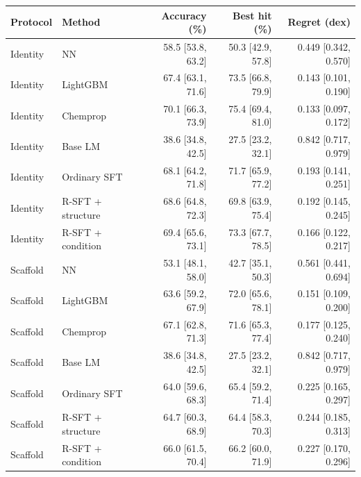 \begingroup\footnotesize
\setlength{\tabcolsep}{3pt}
\begin{tabular}{llrrr}
\toprule
Protocol & Method & Accuracy (\%) & Best hit (\%) & Regret (dex) \\
\midrule
Identity & NN & 58.5 [53.8, 63.2] & 50.3 [42.9, 57.8] & 0.449 [0.342, 0.570] \\
Identity & LightGBM & 67.4 [63.1, 71.6] & 73.5 [66.8, 79.9] & 0.143 [0.101, 0.190] \\
Identity & Chemprop & 70.1 [66.3, 73.9] & 75.4 [69.4, 81.0] & 0.133 [0.097, 0.172] \\
Identity & Base LM & 38.6 [34.8, 42.5] & 27.5 [23.2, 32.1] & 0.842 [0.717, 0.979] \\
Identity & Ordinary SFT & 68.1 [64.2, 71.8] & 71.7 [65.9, 77.2] & 0.193 [0.141, 0.251] \\
Identity & R-SFT + structure & 68.6 [64.8, 72.3] & 69.8 [63.9, 75.4] & 0.192 [0.145, 0.245] \\
Identity & R-SFT + condition & 69.4 [65.6, 73.1] & 73.3 [67.7, 78.5] & 0.166 [0.122, 0.217] \\
Scaffold & NN & 53.1 [48.1, 58.0] & 42.7 [35.1, 50.3] & 0.561 [0.441, 0.694] \\
Scaffold & LightGBM & 63.6 [59.2, 67.9] & 72.0 [65.6, 78.1] & 0.151 [0.109, 0.200] \\
Scaffold & Chemprop & 67.1 [62.8, 71.3] & 71.6 [65.3, 77.4] & 0.177 [0.125, 0.240] \\
Scaffold & Base LM & 38.6 [34.8, 42.5] & 27.5 [23.2, 32.1] & 0.842 [0.717, 0.979] \\
Scaffold & Ordinary SFT & 64.0 [59.6, 68.3] & 65.4 [59.2, 71.4] & 0.225 [0.165, 0.297] \\
Scaffold & R-SFT + structure & 64.7 [60.3, 68.9] & 64.4 [58.3, 70.3] & 0.244 [0.185, 0.313] \\
Scaffold & R-SFT + condition & 66.0 [61.5, 70.4] & 66.2 [60.0, 71.9] & 0.227 [0.170, 0.296] \\
\bottomrule
\end{tabular}
\endgroup
